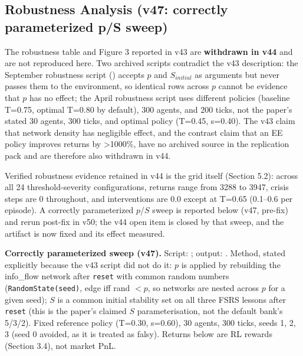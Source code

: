 \documentclass[11pt]{article}
\begin{document}
\subsection{Robustness Analysis (v47: correctly parameterized p/S sweep)}
The robustness table and Figure 3 reported in v43 are \textbf{withdrawn in v44} and are not reproduced here. Two archived scripts contradict the v43 description: the September robustness script () accepts $p$ and $S_{initial}$ as arguments but never passes them to the environment, so identical rows across $p$ cannot be evidence that $p$ has no effect; the April robustness script uses different policies (baseline T=0.75, optimal T=0.80 by default), 300 agents, and 200 ticks, not the paper's stated 30 agents, 300 ticks, and optimal policy (T=0.45, s=0.40). The v43 claim that network density has negligible effect, and the contrast claim that an EE policy improves returns by >1000\%, have no archived source in the replication pack and are therefore also withdrawn in v44.

Verified robustness evidence retained in v44 is the grid itself (Section 5.2): across all 24 threshold-severity configurations, returns range from 3288 to 3947, crisis steps are 0 throughout, and interventions are 0.0 except at T=0.65 (0.1--0.6 per episode). A correctly parameterized $p$/$S$ sweep is reported below (v47, pre-fix) and rerun post-fix in v50; the v44 open item is closed by that sweep, and the artifact is now fixed and its effect measured.

\textbf{Correctly parameterized sweep (v47).} Script: ; output: . Method, stated explicitly because the v43 script did not do it: $p$ is applied by rebuilding the info\_flow network after \texttt{reset} with common random numbers (\texttt{RandomState(seed)}, edge iff rand $< p$, so networks are nested across $p$ for a given seed); $S$ is a common initial stability set on all three FSRS lessons after \texttt{reset} (this is the paper's claimed $S$ parameterisation, not the default bank's 5/3/2). Fixed reference policy (T=0.30, s=0.60), 30 agents, 300 ticks, seeds 1, 2, 3 (seed 0 avoided, as it is treated as falsy). Returns below are RL rewards (Section 3.4), not market PnL.
\end{document}
